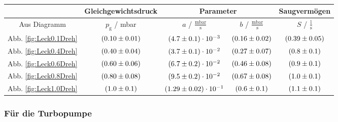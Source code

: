 \begin{table}[H]
   \centering
   \caption{}
   \label{tab:}
   \begin{tabular}{c|c|c|c|c}
     & Gleichgewichtsdruck & \multicolumn{2}{c|}{Parameter} & Saugvermögen \\
     \hline
     Aus Diagramm & $p_\text{g}$ / mbar & $a$ / $\frac{\text{mbar}}{\text{s}}$ & $b$ / $\frac{\text{mbar}}{\text{s}}$ & $S$ / $\frac{\text{l}}{\text{s}}$ \\
     \hline
     Abb. \eqref{fig:Leck0.1Dreh} & $(\num{0.1 +- 0.01})$ & $(\num{4.7 +- 0.1}) \cdot 10^{-3}$ & $(\num{0.16 +- 0.02})$ & $(\num{0.39 +- 0.05})$ \\
     Abb. \eqref{fig:Leck0.4Dreh} & $(\num{0.4 +- 0.04})$ & $(\num{3.7 +- 0.1}) \cdot 10^{-2} $ & $(\num{0.27 +- 0.07}) $ & $(\num{0.8 +- 0.1}) $ \\
     Abb. \eqref{fig:Leck0.6Dreh} & $(\num{0.6 +- 0.06})$ & $(\num{6.7 +- 0.2}) \cdot 10^{-2} $ & $(\num{0.46 +- 0.08}) $ & $(\num{0.9 +- 0.1}) $ \\
     Abb. \eqref{fig:Leck0.8Dreh} & $(\num{0.8 +- 0.08})$ & $(\num{9.5 +- 0.2}) \cdot 10^{-2} $ & $(\num{0.67 +- 0.08}) $ & $(\num{1.0 +- 0.1}) $ \\
     Abb. \eqref{fig:Leck1.0Dreh} & $(\num{1.0 +- 0.1})$ & $(\num{1.29 +- 0.02}) \cdot 10^{-1} $ & $(\num{0.6 +- 0.1}) $ & $(\num{1.1 +- 0.1}) $ \\
 \end{tabular}
\end{table}






\subsubsection{Für die Turbopumpe}









%
